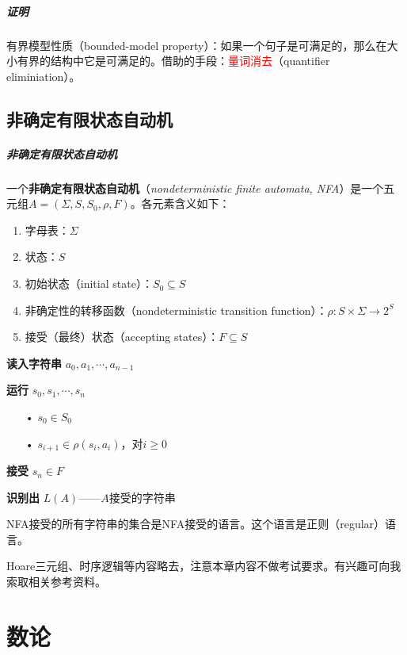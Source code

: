 \documentclass[b5paper,oneside]{ctexbook}
\newcommand{\Red}[1]{\textcolor[named]{red}{#1}}
\begin{document}
\paragraph{证明}有界模型性质（bounded-model property）：如果一个句子是可满足的，那么在大小有界的结构中它是可满足的。借助的手段：\Red{量词消去}（quantifier eliminiation）。
\section{非确定有限状态自动机}
\paragraph{非确定有限状态自动机}一个\textbf{非确定有限状态自动机}（\textit{nondeterministic finite automata, NFA}）是一个五元组$A = (\Sigma, S, S_0, \rho, F )$。各元素含义如下：
\begin{enumerate}
\item  字母表：$\Sigma$
\item  状态：$S$
\item  初始状态（initial state）：$S_0 \subseteq S$
\item  非确定性的转移函数（nondeterministic transition function）：$\rho : S \times \Sigma \to 2^S$
\item  接受（最终）状态（accepting states）：$F \subseteq S$
\end{enumerate}

\textbf{读入字符串} $a_0,a_1,\cdots ,a_{n-1}$

\textbf{运行} $s_0,s_1,\cdots ,s_n$
\begin{enumerate}
\item[•]$s_0\in S_0$
\item[•]$s_{i+1}\in\rho(s_i,a_i)$，对$i\geq 0$
\end{enumerate}

\textbf{接受} $s_n\in F$

\textbf{识别出} $L(A)$——$A$接受的字符串

NFA接受的所有字符串的集合是NFA接受的语言。这个语言是正则（regular）语言。

Hoare三元组、时序逻辑等内容略去，注意本章内容不做考试要求。有兴趣可向我索取相关参考资料。
\chapter{数论}
\label{ftoa}
\end{document}
